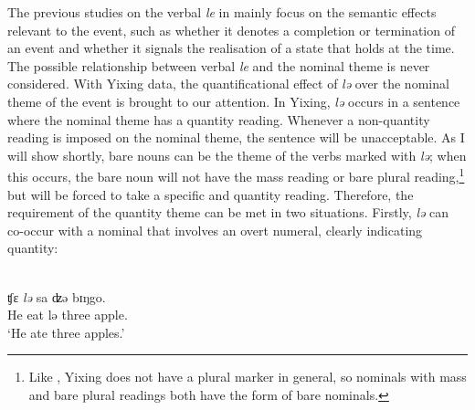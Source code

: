 \documentclass[output=paper]{langsci/langscibook}
\begin{document}
\begin{exe}
\ex {} \begin{xlist}


\end{xlist}
\end{exe}

The previous studies on the verbal \emph{le} in  mainly focus on the
semantic effects relevant to the event, such as whether it denotes a completion
or termination of an event and whether it signals the realisation of a state
that holds at the  time. The possible relationship between verbal
\emph{le} and the nominal theme is never considered. With Yixing data, the
quantificational effect of \emph{lə} over the nominal theme of the event is
brought to our attention. In Yixing, \emph{lə} occurs in a sentence where the
nominal theme has a quantity reading. Whenever a non-quantity reading is
imposed on the nominal theme, the sentence will be unacceptable. As I will show
shortly, bare nouns can be the theme of the verbs marked with \emph{lə}; when
this occurs, the bare noun will not have the mass reading or bare plural
reading,\footnote{Like , Yixing does not have a plural marker in
general, so nominals with mass and bare plural readings both have the form of
bare nominals.} but will be forced to take a specific and quantity reading.
Therefore, the requirement of the quantity theme can be met in two situations.
Firstly, \emph{lə} can co-occur with a nominal that involves an overt numeral,
clearly indicating quantity:

\begin{exe}
    \ex {}\\
    {ʧε} \emph{lə} sa {ʣə} bɪŋgo. \\
    He eat {{lə}} three \Clf{} apple. \\
    \glt \enquote*{He ate three apples.}
\end{exe}
\end{document}
